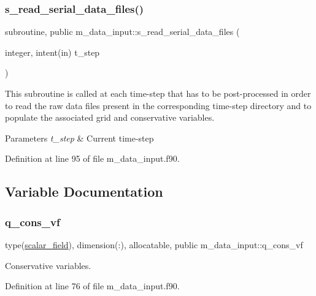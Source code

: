 \subsubsection{\texorpdfstring{s\+\_\+read\+\_\+serial\+\_\+data\+\_\+files()}{s\_read\_serial\_data\_files()}}
{\footnotesize\ttfamily subroutine, public m\+\_\+data\+\_\+input\+::s\+\_\+read\+\_\+serial\+\_\+data\+\_\+files (\begin{DoxyParamCaption}\item[{integer, intent(in)}]{t\+\_\+step }\end{DoxyParamCaption})}



This subroutine is called at each time-\/step that has to be post-\/processed in order to read the raw data files present in the corresponding time-\/step directory and to populate the associated grid and conservative variables. 


\begin{DoxyParams}{Parameters}
{\em t\+\_\+step} & Current time-\/step \\
\hline
\end{DoxyParams}


Definition at line 95 of file m\+\_\+data\+\_\+input.\+f90.



\subsection{Variable Documentation}
\mbox{\label{namespacem__data__input_a464b144d544f769a0d9a1b549c510e1f}} 
\subsubsection{\texorpdfstring{q\+\_\+cons\+\_\+vf}{q\_cons\_vf}}
{\footnotesize\ttfamily type(\hyperlink{structm__derived__types_1_1scalar__field}{scalar\+\_\+field}), dimension(\+:), allocatable, public m\+\_\+data\+\_\+input\+::q\+\_\+cons\+\_\+vf}



Conservative variables. 



Definition at line 76 of file m\+\_\+data\+\_\+input.\+f90.

\mbox{\label{namespacem__data__input_a65ba499d27d4b21b1ec8bcfe02816bd4}} 
